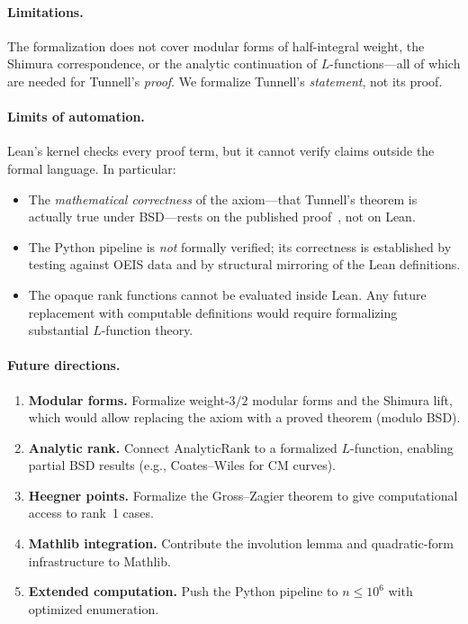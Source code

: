 \documentclass[11pt,a4paper]{article}
\theoremstyle{definition}
\begin{document}
\paragraph{Limitations.}
The formalization does not cover modular forms of half-integral
weight, the Shimura correspondence, or the analytic continuation
of $L$-functions---all of which are needed for Tunnell's
\emph{proof}.  We formalize Tunnell's \emph{statement}, not its
proof.

\paragraph{Limits of automation.}
Lean's kernel checks every proof term, but it cannot verify
claims outside the formal language.  In particular:
\begin{itemize}[nosep]
  \item The \emph{mathematical correctness} of the axiom---that
    Tunnell's theorem is actually true under BSD---rests on
    the published proof~\cite{Tunnell1983}, not on Lean.
  \item The Python pipeline is \emph{not} formally verified;
    its correctness is established by testing against OEIS data
    and by structural mirroring of the Lean definitions.
  \item The opaque rank functions cannot be evaluated inside Lean.
    Any future replacement with computable definitions would
    require formalizing substantial $L$-function theory.
\end{itemize}

\paragraph{Future directions.}
\begin{enumerate}[nosep]
  \item \textbf{Modular forms.}  Formalize weight-$3/2$ modular
    forms and the Shimura lift, which would allow replacing the
    axiom with a proved theorem (modulo BSD).
  \item \textbf{Analytic rank.}  Connect $\mathrm{AnalyticRank}$
    to a formalized $L$-function, enabling partial BSD results
    (e.g., Coates--Wiles for CM curves).
  \item \textbf{Heegner points.}  Formalize the Gross--Zagier
    theorem to give computational access to rank~1 cases.
  \item \textbf{Mathlib integration.}  Contribute the involution
    lemma and quadratic-form infrastructure to Mathlib.
  \item \textbf{Extended computation.}  Push the Python pipeline
    to $n \le 10^6$ with optimized enumeration.
\end{enumerate}
\end{document}
